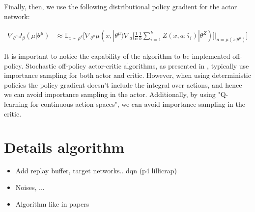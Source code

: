 Finally, then, we use the following distributional policy gradient for the actor network:

\begin{align}
    \nabla_{\theta^\mu} J_\beta(\mu | \theta^\mu) &\approx \mathbb E_{x \sim \rho^\beta} 
    \big [\nabla_{\theta^\mu} \mu(x,| \theta^\mu) \nabla_a  [\frac{1}{\alpha} \frac{1}{k}
    \sum_{i=1}^kZ(x,a; \hat\tau_i) | \theta^Z)]|_{a=\mu(x| \theta^\mu)}  \big]
    \label{eq:actor_grad}
\end{align}

It is important to notice the capability of the algorithm to be implemented off-policy.
Stochastic off-policy actor-critic algorithms, as presented in \citet{Degris2012}, typically
use importance sampling for both actor and critic. 
However, when using deterministic policies the policy gradient doesn't include the integral over actions,
and hence we can avoid importance sampling in the actor.
Additionally, by using "Q-learning for continuous action spaces", we can avoid importance sampling in the critic.


\section{Details algorithm}


\begin{itemize}
	\item Add replay buffer, target networks.. dqn (p4 lillicrap)

	\item Noises, ...
	\item Algorithm like in papers
\end{itemize}














